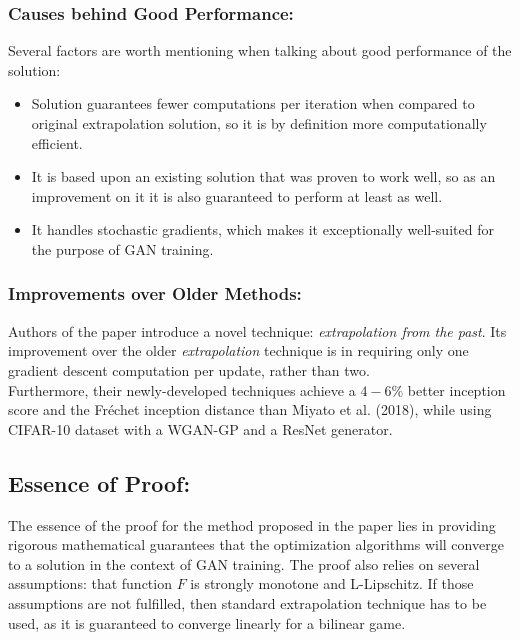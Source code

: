 \documentclass[11pt]{article}
\begin{document}
		\subsubsection{Causes behind Good Performance:}
		Several factors are worth mentioning when talking about good performance of the solution:
		\begin{itemize}
			\item Solution guarantees fewer computations per iteration when compared to original extrapolation solution, so it is by definition more computationally efficient.
			\item It is based upon an existing solution that was proven to work well, so as an improvement on it it is also guaranteed to perform at least as well.
			\item It handles stochastic gradients, which makes it exceptionally well-suited for the purpose of GAN training. 
		\end{itemize}
		
		\subsubsection{Improvements over Older Methods:}
		Authors of the paper introduce a novel technique: \textit{extrapolation from the past}. Its improvement over the older \textit{extrapolation} technique is in requiring only one gradient descent computation per update, rather than two. \\
		Furthermore, their newly-developed techniques achieve a $4-6\%$ better inception score and the Fr\'echet inception distance than Miyato et al. (2018), while using CIFAR-10 dataset with a WGAN-GP and a ResNet generator.
	
	\subsection{Essence of Proof:}
	
	The essence of the proof for the method proposed in the paper lies in providing rigorous mathematical guarantees that the optimization algorithms will converge to a solution in the context of GAN training. The proof also relies on several assumptions: that function $F$ is strongly monotone and L-Lipschitz. If those assumptions are not fulfilled, then standard extrapolation technique has to be used, as it is guaranteed to converge linearly for a bilinear game.
	
\end{document}
